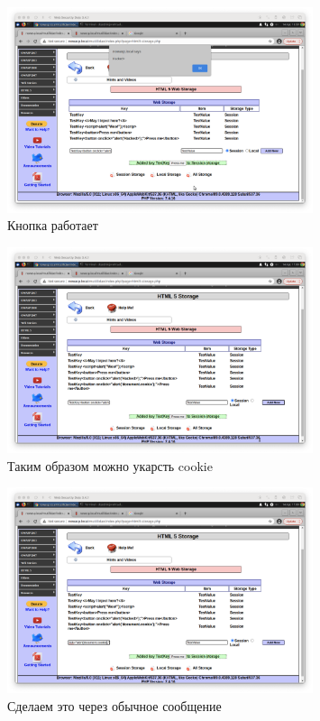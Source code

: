 \documentclass[a4paper]{article}
\begin{document}
  \begin{figure}[H]
    \centering
    \includegraphics[width=0.8\textwidth]{step_00044}
    \caption{Кнопка работает}
  \end{figure}

  \begin{figure}[H]
    \centering
    \includegraphics[width=0.8\textwidth]{step_00045}
    \caption{Таким образом можно укарсть cookie}
  \end{figure}

  \begin{figure}[H]
    \centering
    \includegraphics[width=0.8\textwidth]{step_00047}
    \caption{Сделаем это через обычное сообщение}
  \end{figure}
\end{document}
